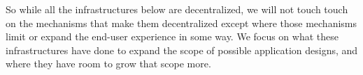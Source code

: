 So while all the infrastructures below are decentralized,
we will not touch touch on the mechanisms that make them decentralized except where those mechanisms limit or expand the end-user experience in some way.
We focus on what these infrastructures have done to expand the scope of possible application designs, and where they have room to grow that scope more.








